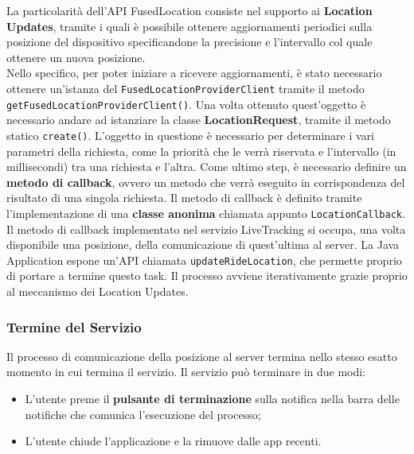                         La particolarità dell'API FusedLocation consiste nel supporto ai \textbf{Location Updates}, tramite i quali è possibile ottenere aggiornamenti periodici sulla posizione del dispositivo specificandone la precisione e l'intervallo col quale ottenere un nuova posizione. \\
                        Nello specifico, per poter iniziare a ricevere aggiornamenti, è stato necessario ottenere un'istanza del \texttt{FusedLocationProviderClient} tramite il metodo \\ \texttt{getFusedLocationProviderClient()}.
                        Una volta ottenuto quest'oggetto è necessario andare ad istanziare la classe \textbf{LocationRequest}, tramite il metodo statico \texttt{create()}. L'oggetto in questione è necessario per determinare i vari parametri della richiesta, come la priorità che le verrà riservata e l'intervallo (in millisecondi) tra una richiesta e l'altra.
                        Come ultimo step, è necessario definire un \textbf{metodo di callback}, ovvero un metodo che verrà eseguito in corrispondenza del risultato di una singola richiesta. Il metodo di callback è definito tramite l'implementazione di una \textbf{classe anonima} chiamata appunto \texttt{LocationCallback}.\\
                        Il metodo di callback implementato nel servizio LiveTracking si occupa, una volta disponibile una posizione, della comunicazione di quest'ultima al server. 
                        La Java Application espone un'API chiamata \texttt{updateRideLocation}, che permette proprio di portare a termine questo task.
                        Il processo avviene iterativamente grazie proprio al meccanismo dei Location Updates. 
                        
                        \newpage
                        
                        \subsubsection{Termine del Servizio}
                            Il processo di comunicazione della posizione al server termina nello stesso esatto momento in cui termina il servizio.
                            Il servizio può terminare in due modi:

                            \begin{itemize}
                                \item L'utente preme il \textbf{pulsante di terminazione} sulla notifica nella barra delle notifiche che comunica l'esecuzione del processo;
                                \item L'utente chiude l'applicazione e la rimuove dalle app recenti.
                            \end{itemize}

